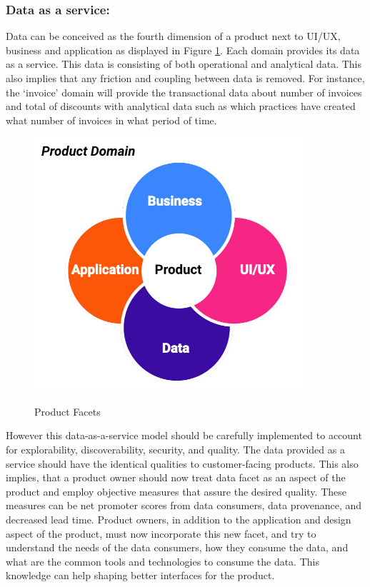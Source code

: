\documentclass{bmcart}
\begin{document}
\subsubsection{Data as a service:}

Data can be conceived as the fourth dimension of a product next to UI/UX, business and application as displayed in Figure \ref{data-facets}. Each domain provides its data as a service. This data is consisting of both operational and analytical data. This also implies that any friction and coupling between data is removed. For instance, the `invoice' domain will provide the transactional data about number of invoices and total of discounts with analytical data such as which practices have created what number of invoices in what period of time.

\begin{figure}[h!]
    \centering
    \includegraphics[width=10cm]{Media/product-facets.jpg}
    \label{data-facets}
    \caption{Product Facets}
\end{figure}

However this data-as-a-service model should be carefully implemented to account for explorability, discoverability, security, and quality. The data provided as a service should have the identical qualities to customer-facing products. This also implies, that a product owner should now treat data facet as an aspect of the product and employ objective measures that assure the desired quality. These measures can be net promoter scores from data consumers, data provenance, and decreased lead time. Product owners, in addition to the application and design aspect of the product, must now incorporate this new facet, and try to understand the needs of the data consumers, how they consume the data, and what are the common tools and technologies to consume the data. This knowledge can help shaping better interfaces for the product.
\end{document}
